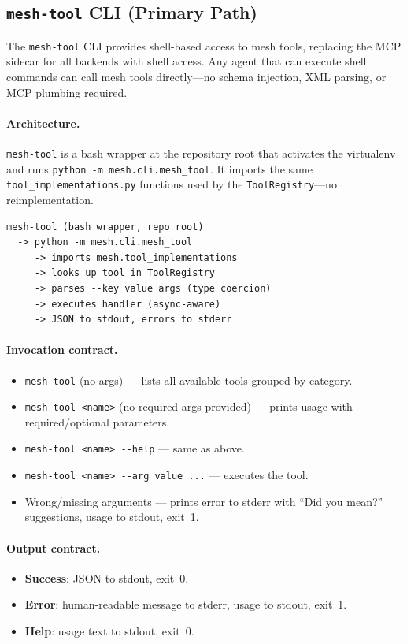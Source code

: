 \documentclass[11pt,a4paper]{article}
\newcommand{\code}[1]{\texttt{#1}}
\begin{document}
\subsection{\code{mesh-tool} CLI (Primary Path)}
\label{sec:mesh-tool}

The \code{mesh-tool} CLI provides shell-based access to mesh tools,
replacing the MCP sidecar for all backends with shell access. Any agent
that can execute shell commands can call mesh tools directly---no schema
injection, XML parsing, or MCP plumbing required.

\paragraph{Architecture.}
\code{mesh-tool} is a bash wrapper at the repository root that activates
the virtualenv and runs \code{python -m mesh.cli.mesh\_tool}. It imports
the same \code{tool\_implementations.py} functions used by the
\code{ToolRegistry}---no reimplementation.

\begin{lstlisting}
mesh-tool (bash wrapper, repo root)
  -> python -m mesh.cli.mesh_tool
     -> imports mesh.tool_implementations
     -> looks up tool in ToolRegistry
     -> parses --key value args (type coercion)
     -> executes handler (async-aware)
     -> JSON to stdout, errors to stderr
\end{lstlisting}

\paragraph{Invocation contract.}
\begin{itemize}[nosep]
  \item \code{mesh-tool} (no args) --- lists all available tools grouped
        by category.
  \item \code{mesh-tool <name>} (no required args provided) --- prints
        usage with required/optional parameters.
  \item \code{mesh-tool <name> -{}-help} --- same as above.
  \item \code{mesh-tool <name> -{}-arg value ...} --- executes the tool.
  \item Wrong/missing arguments --- prints error to stderr with
        ``Did you mean?'' suggestions, usage to stdout, exit~1.
\end{itemize}

\paragraph{Output contract.}
\begin{itemize}[nosep]
  \item \textbf{Success}: JSON to stdout, exit~0.
  \item \textbf{Error}: human-readable message to stderr, usage to
        stdout, exit~1.
  \item \textbf{Help}: usage text to stdout, exit~0.
\end{itemize}
\end{document}
